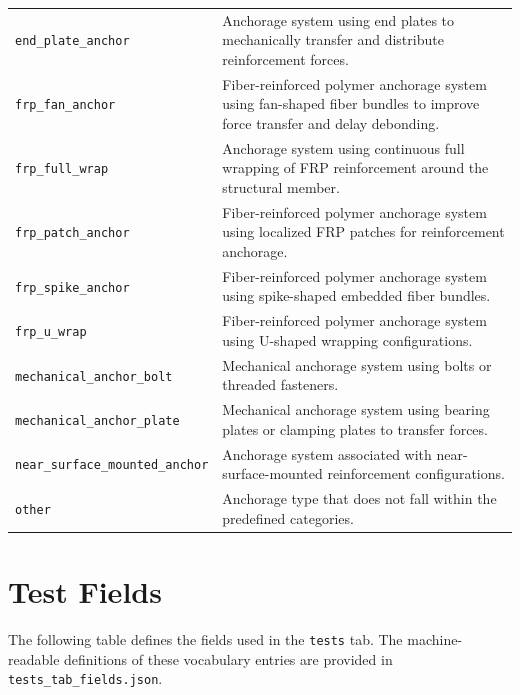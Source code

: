 \documentclass[11pt]{book}
\begin{document}
{\begin{longtable}{p{}p{}}
\texttt{end\_plate\_anchor} &
Anchorage system using end plates to mechanically transfer and distribute reinforcement forces. \\

\texttt{frp\_fan\_anchor} &
Fiber-reinforced polymer anchorage system using fan-shaped fiber bundles to improve force transfer and delay debonding. \\

\texttt{frp\_full\_wrap} &
Anchorage system using continuous full wrapping of FRP reinforcement around the structural member. \\

\texttt{frp\_patch\_anchor} &
Fiber-reinforced polymer anchorage system using localized FRP patches for reinforcement anchorage. \\

\texttt{frp\_spike\_anchor} &
Fiber-reinforced polymer anchorage system using spike-shaped embedded fiber bundles. \\

\texttt{frp\_u\_wrap} &
Fiber-reinforced polymer anchorage system using U-shaped wrapping configurations. \\

\texttt{mechanical\_anchor\_bolt} &
Mechanical anchorage system using bolts or threaded fasteners. \\

\texttt{mechanical\_anchor\_plate} &
Mechanical anchorage system using bearing plates or clamping plates to transfer forces. \\

\texttt{near\_surface\_mounted\_anchor} &
Anchorage system associated with near-surface-mounted reinforcement configurations. \\

\texttt{other} &
Anchorage type that does not fall within the predefined categories. \\

\hline
\end{longtable}






\section{Test Fields}
\label{vocab:test_fields_tab}

The following table defines the fields used in the \texttt{tests} tab. The machine-readable definitions of these vocabulary entries are provided in \texttt{tests\_tab\_fields.json}.

}
\end{document}
